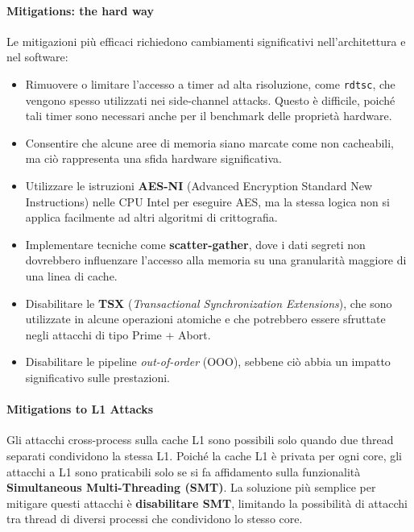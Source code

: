 \paragraph{Mitigations: the hard way}
Le mitigazioni più efficaci richiedono cambiamenti significativi nell'architettura e nel software:

\begin{itemize}
  \item Rimuovere o limitare l'accesso a timer ad alta risoluzione, come \texttt{rdtsc}, che vengono spesso utilizzati nei side-channel attacks. Questo è difficile, poiché tali timer sono necessari anche per il benchmark delle proprietà hardware.
  \item Consentire che alcune aree di memoria siano marcate come non cacheabili, ma ciò rappresenta una sfida hardware significativa.
  \item Utilizzare le istruzioni \textbf{AES-NI} (Advanced Encryption Standard New Instructions) nelle CPU Intel per eseguire AES, ma la stessa logica non si applica facilmente ad altri algoritmi di crittografia.
  \item Implementare tecniche come \textbf{scatter-gather}, dove i dati segreti non dovrebbero influenzare l'accesso alla memoria su una granularità maggiore di una linea di cache.
  \item Disabilitare le \textbf{TSX} (\emph{Transactional Synchronization Extensions}), che sono utilizzate in alcune operazioni atomiche e che potrebbero essere sfruttate negli attacchi di tipo Prime + Abort.
  \item Disabilitare le pipeline \emph{out-of-order} (OOO), sebbene ciò abbia un impatto significativo sulle prestazioni.
\end{itemize}

\paragraph{Mitigations to L1 Attacks}
Gli attacchi cross-process sulla cache L1 sono possibili solo quando due thread separati condividono la stessa L1. Poiché la cache L1 è privata per ogni core, gli attacchi a L1 sono praticabili solo se si fa affidamento sulla funzionalità \textbf{Simultaneous Multi-Threading (SMT)}. La soluzione più semplice per mitigare questi attacchi è \textbf{disabilitare SMT}, limitando la possibilità di attacchi tra thread di diversi processi che condividono lo stesso core.


